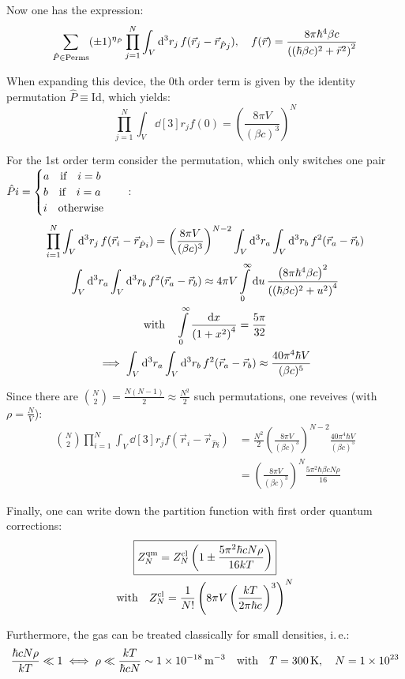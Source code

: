 \documentclass[11pt,a4paper]{scrartcl}
\newcommand{\ie}{i.\,e.}
\begin{document}
Now one has the expression:
\begin{equation*}
    \sum_{\hat{P}\in\mathrm{Perms}}(\pm1)^{\eta_{\hat{P}}}\prod_{j=1}^{N}\int_V\dd[3]{r_j}
    f(\vec{r}_{j}-\vec{r}_{\hat{P}j})\qc
    f(\vec{r})=\frac{8\pi\hbar^4\beta c}{\left((\hbar\beta c)^2+\vec{r}^2\right)^2}
\end{equation*}

When expanding this device, the 0th order term is given by the identity
permutation $\hat{P}\equiv\mathrm{Id}$, which yields:
\begin{equation*}
    \prod_{j=1}^{N}\int_{V}\dd[3]{r_j}f(0)=\left(\frac{8\pi V}{(\beta
    c)^3}\right)^N
\end{equation*}

For the 1st order term consider the permutation, which only switches one pair
$\hat{P}i=
\begin{cases}
    a\qif i=b\\
    b\qif i=a\\
    i\qotherwise
\end{cases}
$:
\begin{gather*}
    \prod_{i=1}^{N}\int_{V}\dd[3]{r_j}f(\vec{r}_{i}-\vec{r}_{\hat{P}i})
    =\left(\frac{8\pi V}{(\beta
    c)^3}\right)^{N-2}\int_{V}\dd[3]{r_a}\int_{V}\dd[3]{r_b}f^2(\vec{r}_a-\vec{r}_b)
    \\
    \int_{V}\dd[3]{r_a}\int_{V}\dd[3]{r_b}f^2(\vec{r}_a-\vec{r}_b)\approx
    4\pi V\int\limits_{0}^{\infty}\dd{u}
    \frac{\left(8\pi\hbar^4\beta c\right)^2}{\left((\hbar\beta
    c)^2+u^2\right)^4} \\
    \qq*{with}
    \int\limits_{0}^{\infty}\frac{\dd{x}}{\left(1+x^2\right)^4}=\frac{5\pi}{32}\\
    \implies
    \int_{V}\dd[3]{r_a}\int_{V}\dd[3]{r_b}f^2(\vec{r}_a-\vec{r}_b)\approx
    \frac{40\pi^4\hbar V}{(\beta c)^5}
\end{gather*}

Since there are $\binom{N}{2}=\frac{N(N-1)}{2}\approx\frac{N^2}{2}$ such
permutations, one reveives (with $\rho=\frac{N}{V}$):
\begin{align*}
    \binom{N}{2}\prod_{i=1}^{N}\int_{V}\dd[3]{r_j}f(\vec{r}_{i}-\vec{r}_{\hat{P}i})
    &=\frac{N^2}{2}\left(\frac{8\pi V}{(\beta
    c)^3}\right)^{N-2}\frac{40\pi^4\hbar V}{(\beta c)^5} \\
    &=\left(\frac{8\pi V}{(\beta c)^3}\right)^{N}\frac{5\pi^2\hbar\beta c
    N\rho}{16}
\end{align*}

Finally, one can write down the partition function with first order quantum
corrections:
\begin{gather*}
    \boxed{%
        Z_{N}^{\mathrm{qm}} = Z_{N}^{\mathrm{cl}}\left(1\pm\frac{5\pi^2\hbar c N\rho}{16kT}\right)
    }\\
    \qq*{with} Z_{N}^{\mathrm{cl}}=\frac{1}{N!}\left(8\pi V\left(\frac{kT}{2\pi\hbar
    c}\right)^3\right)^N
\end{gather*}

Furthermore, the gas can be treated classically for small densities, \ie:
\begin{equation*}
    \frac{\hbar c N\rho}{kT}\ll1
    \iff \rho\ll\frac{kT}{\hbar c N}
    \sim\SI{1e-18}{\per\cubic\metre}
    \qq{with}T=\SI{300}{\kelvin}\qc N=\num{1e23}
\end{equation*}
\end{document}
